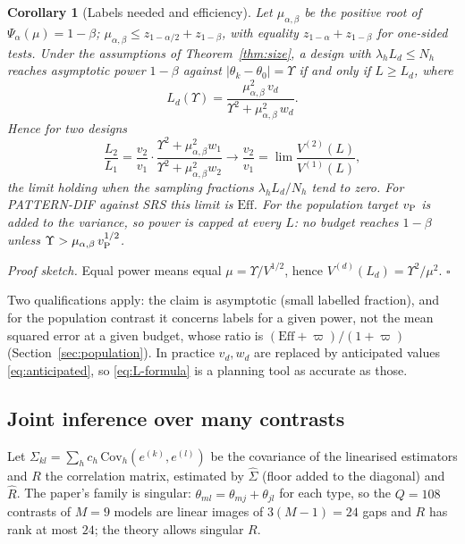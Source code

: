 \documentclass[pdflatex,sn-mathphys-num,iicol]{sn-jnl}
\theoremstyle{thmstyleone}
\newtheorem{corollary}[proposition]{Corollary}
\theoremstyle{thmstyletwo}
\theoremstyle{thmstylethree}
\begin{document}
\begin{corollary}[Labels needed and efficiency]\label{cor:are}
Let $\mu_{\alpha,\beta}$ be the positive root of $\Psi_\alpha(\mu)=1-\beta$; $\mu_{\alpha,\beta}\le z_{1-\alpha/2}+z_{1-\beta}$, with equality $z_{1-\alpha}+z_{1-\beta}$ for one-sided tests. Under the assumptions of Theorem~\ref{thm:size}, a design with $\lambda_hL_d\le N_h$ reaches asymptotic power $1-\beta$ against $|\theta_k-\theta_0|=\Upsilon$ if and only if $L\ge L_d$, where
\begin{equation}\label{eq:L-formula}
L_d(\Upsilon)=\frac{\mu_{\alpha,\beta}^2\,v_d}{\Upsilon^2+\mu_{\alpha,\beta}^2\,w_d}.
\end{equation}
Hence for two designs
\begin{equation}\label{eq:are}
\frac{L_2}{L_1}=\frac{v_2}{v_1}\cdot\frac{\Upsilon^2+\mu^2_{\alpha,\beta}w_1}{\Upsilon^2+\mu^2_{\alpha,\beta}w_2}\longrightarrow\frac{v_2}{v_1}=\lim\frac{V^{(2)}(L)}{V^{(1)}(L)},
\end{equation}
the limit holding when the sampling fractions $\lambda_hL_d/N_h$ tend to zero. For PATTERN-DIF against SRS this limit is $\mathrm{Eff}$. For the population target $v_{\rm P}$ is added to the variance, so power is capped at every $L$: no budget reaches $1-\beta$ unless $\Upsilon>\mu_{\alpha,\beta}\,v_{\rm P}^{1/2}$.
\end{corollary}

\emph{Proof sketch.} Equal power means equal $\mu=\Upsilon/V^{1/2}$, hence $V^{(d)}(L_d)=\Upsilon^2/\mu^2$. $\square$

Two qualifications apply: the claim is asymptotic (small labelled fraction), and for the population contrast it concerns labels for a given power, not the mean squared error at a given budget, whose ratio is $(\mathrm{Eff}+\varpi)/(1+\varpi)$ (Section~\ref{sec:population}). In practice $v_d,w_d$ are replaced by anticipated values \eqref{eq:anticipated}, so \eqref{eq:L-formula} is a planning tool as accurate as those.

\subsection{Joint inference over many contrasts}\label{sec:test-joint}

Let $\Sigma_{kl}=\sum_hc_h\,\mathrm{Cov}_h(e^{(k)},e^{(l)})$ be the covariance of the linearised estimators and $R$ the correlation matrix, estimated by $\hat\Sigma$ (floor added to the diagonal) and $\hat R$. The paper's family is singular: $\theta_{ml}=\theta_{mj}+\theta_{jl}$ for each type, so the $Q=108$ contrasts of $M=9$ models are linear images of $3(M-1)=24$ gaps and $R$ has rank at most $24$; the theory allows singular $R$.
\end{document}
